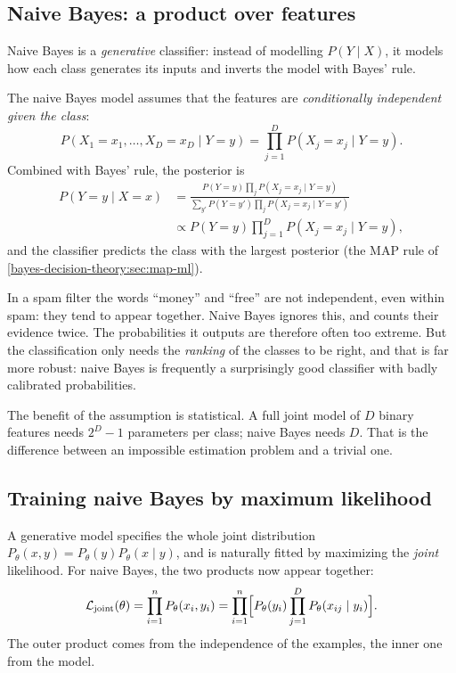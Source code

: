 \begin{notechapter}
\section{Naive Bayes: a product over features}\label{generative-discriminative:sec:nb}

Naive Bayes is a \emph{generative} classifier: instead of modelling
$P(Y\mid X)$, it models how each class generates its inputs and inverts the
model with Bayes' rule.

\begin{definition}
The naive Bayes model assumes that the features are \emph{conditionally
independent given the class}:
\[
  P(X_1 = x_1,\dots,X_D = x_D\mid Y = y) = \prod_{j=1}^D P(X_j = x_j\mid Y = y).
\]
Combined with Bayes' rule, the posterior is
\begin{align*}
  P(Y = y\mid X = x) &= \frac{P(Y=y)\prod_j P(X_j = x_j\mid Y = y)}{\sum_{y'}P(Y=y')\prod_jP(X_j = x_j\mid Y = y')}\\
  &\propto P(Y = y)\prod_{j=1}^D P(X_j = x_j\mid Y = y),
\end{align*}
and the classifier predicts the class with the largest posterior (the MAP rule of
\cref{bayes-decision-theory:sec:map-ml}).
\end{definition}

\begin{intuition}
In a spam filter the words ``money'' and ``free'' are not independent, even
within spam: they tend to appear together. Naive Bayes ignores this, and
counts their evidence twice. The probabilities it outputs are therefore often
too extreme. But the classification only needs the \emph{ranking} of the
classes to be right, and that is far more robust: naive Bayes is frequently a
surprisingly good classifier with badly calibrated probabilities.
\end{intuition}

The benefit of the assumption is statistical. A full joint model of $D$ binary
features needs $2^D - 1$ parameters per class; naive Bayes needs $D$. That is
the difference between an impossible estimation problem and a trivial one.

\subsection{Training naive Bayes by maximum likelihood}

A generative model specifies the whole joint distribution
$P_\theta(x,y) = P_\theta(y)P_\theta(x\mid y)$, and is naturally fitted by
maximizing the \emph{joint} likelihood. For naive Bayes, the two products now
appear together:
\[
  \mathcal L_{\mathrm{joint}}(\theta) = \prod_{i=1}^n P_\theta(x_i, y_i)
  = \prod_{i=1}^n\Bigl[P_\theta(y_i)\prod_{j=1}^D P_\theta(x_{ij}\mid y_i)\Bigr].
\]
The outer product comes from the independence of the examples, the inner one
from the model.


\end{notechapter}
